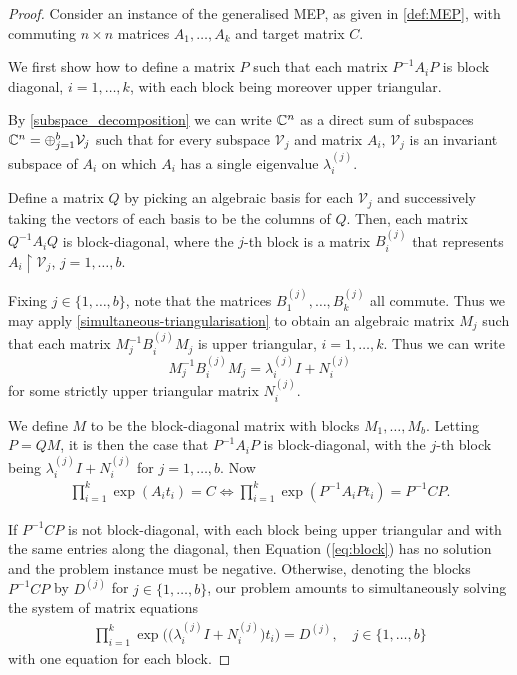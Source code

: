 \begin{proof}
  Consider an instance of the generalised MEP, as given in \cref{def:MEP},
  with commuting $n\times n$ matrices $A_1,\ldots,A_k$ and target
  matrix $C$.

  We first show how to define a matrix $P$ such that each matrix
  $P^{-1}A_iP$ is block diagonal, $i=1,\ldots,k$, with each block
  being moreover upper triangular.

  By \cref{subspace_decomposition} we can write $\mathbb{C}^n$
  as a direct sum of subspaces $\mathbb{C}^n = \oplus_{j=1}^b \mathcal{V}_j$
  such that for every subspace $\mathcal{V}_j$ and matrix $A_i$, $\mathcal{V}_j$ is an
  invariant subspace of $A_i$ on which $A_i$ has a single eigenvalue
  $\lambda_i^{(j)}$.

  Define a matrix $Q$ by picking an algebraic basis for each
  $\mathcal{V}_j$ and successively taking the vectors of each basis to
  be the columns of $Q$. Then, each matrix $Q^{-1} A_{i} Q$ is
  block-diagonal, where the $j$-th block is a matrix $B^{(j)}_i$ that
  represents $A_{i} \restriction{\mathcal{V}_j}$, $j=1,\ldots,b$.

  Fixing $j\in\{1,\ldots,b\}$, note that the
  matrices $B_1^{(j)},\ldots,B_k^{(j)}$ all commute.  Thus we
  may apply \cref{simultaneous-triangularisation} to obtain an
  algebraic matrix $M_j$ such that each matrix $M_j^{-1} B^{(j)}_{i} M_j$
  is upper triangular, $i=1,\ldots,k$.  Thus we can write
  \[ M_j^{-1} B^{(j)}_{i} M_j = \lambda_i^{(j)}I + N_i^{(j)} \]
  for some strictly upper triangular matrix $ N_i^{(j)}$.

  We define $M$ to be the block-diagonal matrix with blocks $M_1,\ldots,M_b$.
  Letting $P=QM$, it is then the case
  that $P^{-1} A_{i} P$ is block-diagonal, with the $j$-th block being
  $\lambda_i^{(j)}I + N_i^{(j)}$ for $j=1,\ldots,b$.  Now
\begin{align}
\prod \limits_{i=1}^{k} \exp(A_{i} t_{i}) = C \Leftrightarrow \prod \limits_{i=1}^{k} \exp(P^{-1}A_{i}P t_{i}) = P^{-1}CP .
\label{eq:block}
\end{align}

If $P^{-1}CP$ is not block-diagonal, with each block being upper
triangular and with the same entries along the diagonal, then Equation
(\ref{eq:block}) has no solution and the problem instance must be
negative. Otherwise, denoting the blocks $P^{-1}CP$ by $D^{(j)}$ for
$j \in \lbrace 1, \ldots, b \rbrace$, our problem amounts to
simultaneously solving the system of matrix equations
\begin{align}
\prod\limits_{i=1}^{k} \exp\big(\big(\lambda_i^{(j)}I + N_i^{(j)}\big)t_{i}\big) = D^{(j)}, \quad j \in \lbrace 1, \ldots, b \rbrace
\label{eq:main1}
\end{align}
with one equation for each block.


\end{proof}
